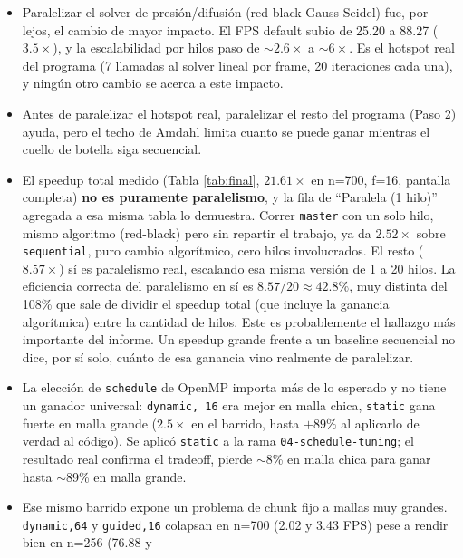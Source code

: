 \documentclass[11pt]{article}
\begin{document}
\begin{itemize}
    \item Paralelizar el solver de presión/difusión (red-black
        Gauss-Seidel) fue, por lejos, el cambio de mayor impacto. El FPS
        default subio de 25.20 a 88.27 ($3.5\times$), y la escalabilidad
        por hilos paso de $\sim 2.6\times$ a $\sim 6\times$. Es el
        hotspot real del programa (7 llamadas al solver lineal por
        frame, 20 iteraciones cada una), y ningún otro cambio se acerca
        a este impacto.
    \item Antes de paralelizar el hotspot real, paralelizar el resto del
        programa (Paso 2) ayuda, pero el techo de Amdahl limita cuanto se
        puede ganar mientras el cuello de botella siga secuencial.
    \item El speedup total medido (Tabla \ref{tab:final}, $21.61\times$ en
        n=700, f=16, pantalla completa) \textbf{no es puramente
        paralelismo}, y la fila de ``Paralela (1 hilo)'' agregada a esa
        misma tabla lo demuestra. Correr \texttt{master} con un solo
        hilo, mismo algoritmo (red-black) pero sin repartir el trabajo,
        ya da $2.52\times$ sobre \texttt{sequential}, puro cambio
        algorítmico, cero hilos involucrados. El resto ($8.57\times$) sí
        es paralelismo real, escalando esa misma versión de 1 a 20
        hilos. La eficiencia correcta del paralelismo en sí es
        $8.57/20 \approx 42.8\%$, muy distinta del 108\% que sale de
        dividir el speedup total (que incluye la ganancia algorítmica)
        entre la cantidad de hilos. Este es probablemente el hallazgo
        más importante del informe. Un speedup grande frente a un
        baseline secuencial no dice, por sí solo, cuánto de esa
        ganancia vino realmente de paralelizar.
    \item La elección de \texttt{schedule} de OpenMP importa más de lo
        esperado y no tiene un ganador universal: \texttt{dynamic, 16}
        era mejor en malla chica, \texttt{static} gana fuerte en malla
        grande ($2.5\times$ en el barrido, hasta $+89\%$ al aplicarlo de
        verdad al código). Se aplicó \texttt{static} a la rama
        \texttt{04-schedule-tuning}; el resultado real confirma el
        tradeoff, pierde $\sim$8\% en malla chica para ganar hasta
        $\sim$89\% en malla grande.
    \item Ese mismo barrido expone un problema de chunk fijo a mallas muy
        grandes. \texttt{dynamic,64} y \texttt{guided,16} colapsan en
        n=700 (2.02 y 3.43 FPS) pese a rendir bien en n=256 (76.88 y

\end{itemize}
\end{document}
